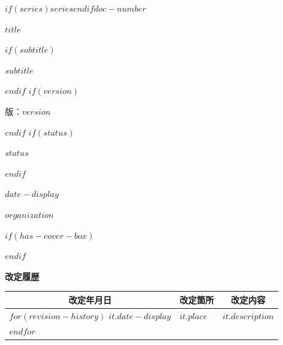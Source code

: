 \documentclass[10pt,a4paper]{article}
\begin{document}
\begin{titlepage}
\vspace*{10mm}
\begin{flushright}
{\sffamily\bfseries\fontsize{12.5pt}{18pt}\selectfont $if(series)$$series$\hspace{1em}$endif$$doc-number$\par}
\end{flushright}
\vspace{16mm}
\begin{center}
{\sffamily\bfseries\fontsize{17pt}{30pt}\selectfont $title$\par}
$if(subtitle)$
\vspace{6mm}
{\sffamily\bfseries\fontsize{15pt}{26pt}\selectfont $subtitle$\par}
$endif$
$if(version)$
\vspace{4mm}
{\sffamily 版：$version$\par}
$endif$
$if(status)$
\vspace{2mm}
{\sffamily $status$\par}
$endif$
\vspace{20mm}
{\sffamily\bfseries\fontsize{12.5pt}{20pt}\selectfont $date-display$\par}
\vspace{3mm}
{\sffamily\bfseries\fontsize{12.5pt}{20pt}\selectfont $organization$\par}
\end{center}
\vspace{12mm}
$if(has-cover-box)$
{\small\setlength{\fboxsep}{4mm}%
\noindent{}\par}
$endif$
\vfill
\end{titlepage}

\thispagestyle{empty}
{\sffamily\bfseries\fontsize{12pt}{18pt}\selectfont 改定履歴\par}
\vspace{0.8\baselineskip}
\noindent
\begin{longtable}{|p{30mm}|p{22mm}|p{\dimexpr\linewidth-52mm-6\tabcolsep-4\arrayrulewidth\relax}|}
\hline
\multicolumn{1}{|c|}{\sffamily 改定年月日} &
\multicolumn{1}{c|}{\sffamily 改定箇所} &
\multicolumn{1}{c|}{\sffamily 改定内容} \\
\hline
\endfirsthead
\hline
\endhead
$for(revision-history)$
$it.date-display$ & $it.place$ & $it.description$ \\
\hline
$endfor$
\end{longtable}
\end{document}
